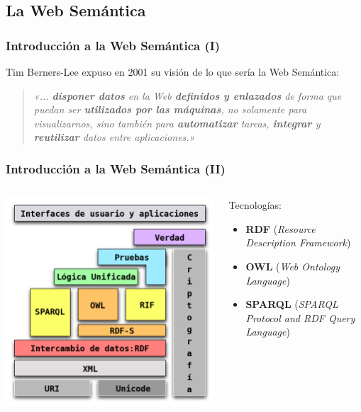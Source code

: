 \documentclass[spanish,notes=hide]{beamer}
\begin{document}
\subsection{La Web Semántica}
\frame
{
  \frametitle{Introducción a la Web Semántica (I)}

  Tim Berners-Lee expuso en 2001 su visión de lo que sería la Web Semántica:

  \begin{quote}
	\emph{«... \textbf{disponer datos} en la Web \textbf{definidos y enlazados} 
	de forma que puedan ser \textbf{utilizados por las máquinas}, no solamente 
	para visualizarnos, sino también para \textbf{automatizar} tareas, 
	\textbf{integrar} y \textbf{reutilizar} datos entre aplicaciones.»}
  \end{quote}
}
\frame
{
  \frametitle{Introducción a la Web Semántica (II)}

  \begin{columns}
    \begin{column}{0.6\textwidth}
	\includegraphics[width=\textwidth]{images/pila-web-semantica.png}
    \end{column}
    \begin{column}{0.4\textwidth}
      Tecnologías:
      \begin{itemize}
	\item \textbf{RDF} (\textit{Resource Description Framework})
	\item \textbf{OWL} (\textit{Web Ontology Language})
	\item \textbf{SPARQL} (\textit{SPARQL Protocol and RDF Query Language})
      \end{itemize}
    \end{column}
  \end{columns}
}
\end{document}
